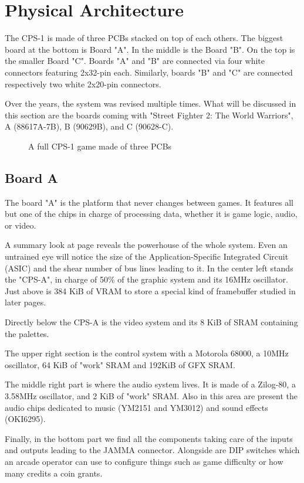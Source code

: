   


\section{Physical Architecture}
 The CPS-1 is made of three PCBs stacked on top of each others. The biggest board at the bottom is Board "A". In the middle is the Board "B". On the top is the smaller Board "C". Boards "A" and "B" are connected via four white connectors featuring 2x32-pin each. Similarly, boards "B" and "C" are connected respectively two white 2x20-pin connectors.

Over the years, the system was revised multiple times. What will be discussed in this section are the boards coming  with "Street Fighter 2: The World Warriors", A (88617A-7B), B (90629B), and C (90628-C).

\begin{figure}[H]
\centering
{}
\caption*{A full CPS-1 game made of three PCBs}
\end{figure}


\subsection{Board A} 
The board "A" is the platform that never changes between games. It features all but one of the chips in charge of processing data, whether it is game logic, audio, or video.

A summary look at page \pageref{fig:boarda} reveals the powerhouse of the whole system. Even an untrained eye will notice the size of the Application-Specific Integrated Circuit (ASIC) and the shear number of bus lines leading to it. In the center left stands the "CPS-A", in charge of 50\% of the graphic system and its 16MHz oscillator. Just above is 384 KiB of VRAM to store a special kind of framebuffer studied in later pages.

Directly below the CPS-A is the video system and its 8 KiB of SRAM containing the palettes.

The upper right section is the control system with a Motorola 68000, a 10MHz oscillator, 64 KiB of "work" SRAM and 192KiB of GFX SRAM. 

The middle right part is where the audio system lives. It is made of a Zilog-80, a 3.58MHz oscillator, and 2 KiB of "work" SRAM. Also in this area are present the audio chips dedicated to music (YM2151 and YM3012) and sound effects (OKI6295).

Finally, in the bottom part we find all the components taking care of the inputs and outputs leading to the JAMMA connector. Alongside are DIP switches which an arcade operator can use to configure things such as game difficulty or how many credits a coin grants.

